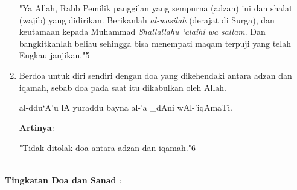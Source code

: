 \documentclass[a4paper,12pt]{article}
\begin{document}
\begin{enumerate}
\par
\indent
"Ya Allah, Rabb Pemilik panggilan yang sempurna (adzan) ini dan shalat 
(wajib) yang didirikan. Berikanlah \textit{al-wasilah} (derajat di Surga), 
dan keutamaan kepada Muhammad \textit{Shallallahu ‘alaihi wa sallam}. Dan 
bangkitkanlah beliau sehingga bisa menempati maqam terpuji yang telah 
Engkau janjikan."{\scriptsize 5}
\item Berdoa untuk diri sendiri dengan doa yang dikehendaki antara adzan 
dan iqamah, sebab doa pada saat itu dikabulkan oleh Allah.
\begin{arabtext}
\noindent
al-ddu`A'u lA yuraddu bayna al-'a _dAni wAl-'iqAmaTi.\\
\end{arabtext}
\noindent
\textbf{Artinya}:
\par
\indent
"Tidak ditolak doa antara adzan dan iqamah."{\scriptsize 6}\\\\
\end{enumerate}
\par
\noindent
\textbf{Tingkatan Doa dan Sanad} :
\end{document}
